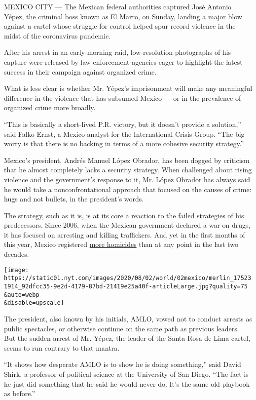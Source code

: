 MEXICO CITY --- The Mexican federal authorities captured José Antonio
Yépez, the criminal boss known as El Marro, on Sunday, landing a major
blow against a cartel whose struggle for control helped spur record
violence in the midst of the coronavirus pandemic.

After his arrest in an early-morning raid, low-resolution photographs of
his capture were released by law enforcement agencies eager to highlight
the latest success in their campaign against organized crime.

What is less clear is whether Mr. Yépez's imprisonment will make any
meaningful difference in the violence that has subsumed Mexico --- or in
the prevalence of organized crime more broadly.

``This is basically a short-lived P.R. victory, but it doesn't provide a
solution,'' said Falko Ernst, a Mexico analyst for the International
Crisis Group. ``The big worry is that there is no backing in terms of a
more cohesive security strategy.''

Mexico's president, Andrés Manuel López Obrador, has been dogged by
criticism that he almost completely lacks a security strategy. When
challenged about rising violence and the government's response to it,
Mr. López Obrador has always said he would take a nonconfrontational
approach that focused on the causes of crime: hugs and not bullets, in
the president's words.

The strategy, such as it is, is at its core a reaction to the failed
strategies of his predecessors. Since 2006, when the Mexican government
declared a war on drugs, it has focused on arresting and killing
traffickers. And yet in the first months of this year, Mexico registered
\href{https://www.reuters.com/article/us-mexico-violence/murders-in-mexico-reach-record-levels-in-first-four-months-of-2020-idUSKBN22W2JC}{more
homicides} than at any point in the last two decades.

\texttt{[image: https://static01.nyt.com/images/2020/08/02/world/02mexico/merlin\_175231914\_92dfcc35-9e2d-4179-87bd-21419e25a40f-articleLarge.jpg?quality=75\\\&auto=webp\\\&disable=upscale]}

The president, also known by his initials, AMLO, vowed not to conduct
arrests as public spectacles, or otherwise continue on the same path as
previous leaders. But the sudden arrest of Mr. Yépez, the leader of the
Santa Rosa de Lima cartel, seems to run contrary to that mantra.

``It shows how desperate AMLO is to show he is doing something,'' said
David Shirk, a professor of political science at the University of San
Diego. ``The fact is he just did something that he said he would never
do. It's the same old playbook as before.''

